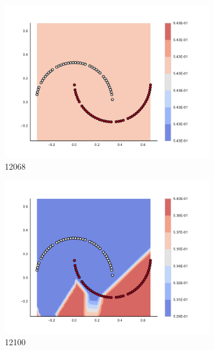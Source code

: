 \begin{figure}[h]
\begin{subfigure}[b]{0.09\textwidth}
    \includegraphics[clip, trim=2.35cm 1.75cm 4.5cm 0cm,width=\textwidth]{img/convergence/12068.pdf}
    \caption{12068}
    \label{fig:convergence_12068}
\end{subfigure}
%
\begin{subfigure}[b]{0.09\textwidth}
    \includegraphics[clip, trim=2.35cm 1.75cm 4.5cm 0cm,width=\textwidth]{img/convergence/12100.pdf}
    \caption{12100}
    \label{fig:convergence_12100}
\end{subfigure}
%
\begin{subfigure}[b]{0.09\textwidth}

\end{subfigure}
\end{figure}
